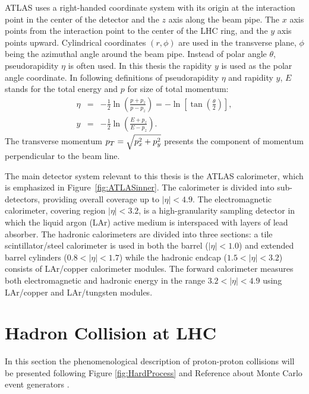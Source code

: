 ATLAS uses a right-handed coordinate system with its origin at the interaction
point in the center of the detector and the $z$ axis along the beam pipe. The
$x$ axis points from the interaction point to the center of the LHC ring, and
the $y$ axis points upward. Cylindrical coordinates $(r, \phi)$ are used in the
transverse plane, $\phi$ being the azimuthal angle around the beam pipe. Instead
of polar angle $\theta$, pseudorapidity $\eta$ is often used. In this thesis
the rapidity $y$ is used as the polar angle coordinate. In following
definitions of pseudorapidity $\eta$ and rapidity $y$, $E$ stands for the total
energy and $p$ for size of total momentum: 
\begin{eqnarray}
  \eta &= & - \frac{1}{2} \ln \left( \frac{p+p_z}{p-p_z} \right) = - \ln \left[
  \tan \left( \frac{\theta}{2} \right) \right], \\ y &= &- \frac{1}{2} \ln
  \left( \frac{E+p_z}{E-p_z} \right).	
\end{eqnarray}
The transverse momentum $p_{T} = \sqrt{p_x^2 + p_y^2}$ presents the component of
momentum perpendicular to the beam line.  

The main detector system relevant to this thesis is the ATLAS calorimeter,
which is emphasized in Figure~\ref{fig:ATLASinner}. The calorimeter is divided
into sub-detectors, providing overall coverage up to $|\eta| < 4.9$. The
electromagnetic calorimeter, covering region $|\eta| < 3.2$, is a
high-granularity sampling detector in which the liquid argon (LAr) active medium
is interspaced with layers of lead absorber. The hadronic calorimeters are
divided into three sections: a tile scintillator/steel calorimeter is used in
both the barrel ($|\eta| < 1.0$) and extended barrel cylinders ($0.8 < |\eta| <
1.7$) while the hadronic endcap ($1.5 < |\eta| < 3.2$) consists of LAr/copper
calorimeter modules. The forward calorimeter measures both electromagnetic and
hadronic energy in the range $3.2 < |\eta| < 4.9$ using LAr/copper and
LAr/tungsten modules. 

\section{Hadron Collision at LHC}

In this section the phenomenological description of proton-proton collisions
will be presented following Figure \ref{fig:HardProcess} and
Reference about Monte Carlo event generators \cite{PDG}.

